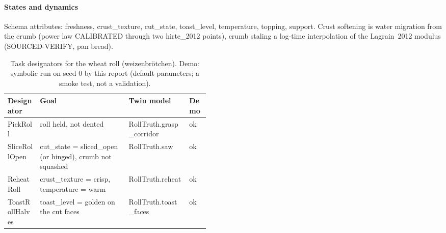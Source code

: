 \documentclass[10.5pt,a4paper]{article}
\begin{document}
\paragraph{States and dynamics} Schema attributes: freshness, crust\_texture, cut\_state, toast\_level, temperature, topping, support. Crust softening is water migration from the crumb (power law CALIBRATED through two hirte\_2012 points),
crumb staling a log-time interpolation of the Lagrain~2012 modulus (SOURCED-VERIFY, pan bread).\begin{table}[htbp]\centering\scriptsize\caption{Task designators for the wheat roll (weizenbrötchen). Demo: symbolic run on seed 0 by this report (default parameters; a smoke test, not a validation).}
\begin{tabularx}{\linewidth}{@{}p{0.16\linewidth}Xp{0.3\linewidth}l@{}}\toprule Designator & Goal & Twin model & Demo \\\midrule
PickRoll & roll held, not dented & RollTruth.grasp\_corridor & ok \\
SliceRollOpen & cut\_state = sliced\_open (or hinged), crumb not squashed & RollTruth.saw & ok \\
ReheatRoll & crust\_texture = crisp, temperature = warm & RollTruth.reheat & ok \\
ToastRollHalves & toast\_level = golden on the cut faces & RollTruth.toast\_faces & ok \\\bottomrule\end{tabularx}\end{table}
\end{document}

